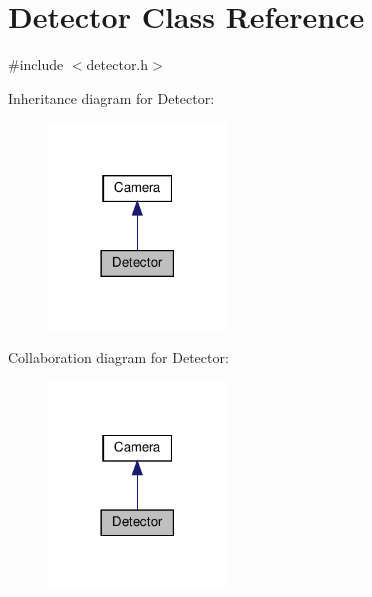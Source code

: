 \hypertarget{classDetector}{}\section{Detector Class Reference}
\label{classDetector}


{\ttfamily \#include $<$detector.\+h$>$}



Inheritance diagram for Detector\+:
\nopagebreak
\begin{figure}[H]
\begin{center}
\leavevmode
\includegraphics[width=134pt]{classDetector__inherit__graph}
\end{center}
\end{figure}


Collaboration diagram for Detector\+:
\nopagebreak
\begin{figure}[H]
\begin{center}
\leavevmode
\includegraphics[width=134pt]{classDetector__coll__graph}
\end{center}
\end{figure}
